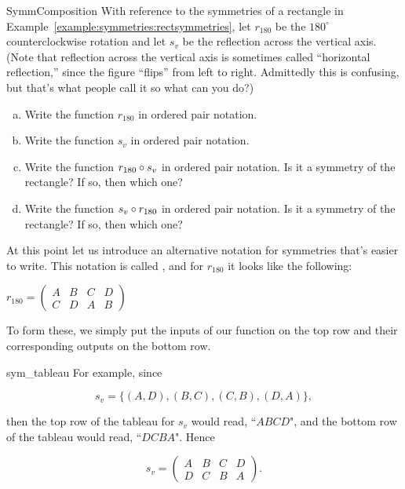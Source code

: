 \begin{exercise}{SymmComposition}
With reference to the symmetries of a rectangle in Example~\ref{example:symmetries:rectsymmetries}, let  $r_{180}$ be the $180^\circ$ counterclockwise rotation and let $s_v$ be the reflection across the vertical axis.
(Note that reflection across the vertical axis is sometimes called ``horizontal reflection,'' since the figure ``flips'' from left to right. Admittedly this is confusing, but that's what people call it so what can you do?)
\begin{enumerate}[(a)]
\item
Write the function $r_{180}$ in ordered pair notation.
\item
Write the function $s_v$ in ordered pair notation.
\item
Write the function $r_{180} \circ s_v$ in ordered pair notation. Is it a symmetry of the rectangle? If so, then which one?
\item
Write the function $s_v \circ r_{180}$ in ordered pair notation. Is it a symmetry of the rectangle? If so, then which one?
\end{enumerate}
\end{exercise}
 
At this point let us introduce an alternative notation for symmetries that's easier to write.  This notation is called , and for $r_{180}$ it looks like the following:
\medskip

$r_{180} = \begin{pmatrix} A & B & C & D \\ C & D & A & B \end{pmatrix} $
\medskip

To form these, we simply put the inputs of our function on the top row and their corresponding outputs on the bottom row.  

\begin{example}{sym_tableau}
For example, since 

\[ s_v = \{(A, D), (B,C), (C, B), (D, A) \}, \]

\noindent
then the top row of the tableau for $s_v$ would read, ``$A  B  C  D$", and the bottom row of the tableau would read, ``$D  C  B  A$".  Hence  

\[ s_v = \begin{pmatrix} A & B & C & D \\ D & C & B & A \end{pmatrix}. \]
\end{example}

